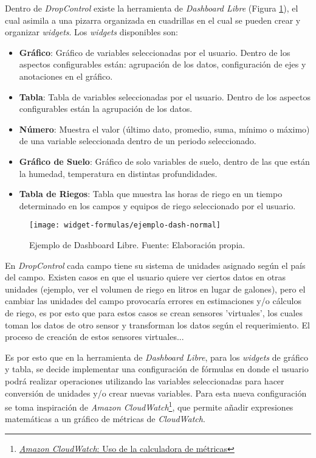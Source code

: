 
Dentro de \textit{DropControl} existe la herramienta de \textit{Dashboard Libre} (Figura \ref{fig:dash-example}), el cual asimila a una pizarra organizada en cuadrillas en el cual se pueden crear y organizar \textit{widgets}.
Los \textit{widgets} disponibles son:
\begin{itemize}
    \item \textbf{Gráfico}: Gráfico de variables seleccionadas por el usuario. Dentro de los aspectos configurables están: agrupación de los datos, configuración de ejes y anotaciones en el gráfico.
    \item \textbf{Tabla}: Tabla de variables seleccionadas por el usuario. Dentro de los aspectos configurables están la agrupación de los datos.
    \item \textbf{Número}: Muestra el valor (último dato, promedio, suma, mínimo o máximo) de una variable seleccionada dentro de un periodo seleccionado.
    \item \textbf{Gráfico de Suelo}: Gráfico de solo variables de suelo, dentro de las que están la humedad, temperatura en distintas profundidades.
    \item \textbf{Tabla de Riegos}: Tabla que muestra las horas de riego en un tiempo determinado en los campos y equipos de riego seleccionado por el usuario.
\end{itemize}

\begin{figure}[H]
	\centering
	\texttt{[image: widget-formulas/ejemplo-dash-normal]}
	\caption{\label{fig:dash-example} Ejemplo de Dashboard Libre. Fuente: Elaboración propia.}
\end{figure}

En \textit{DropControl} cada campo tiene su sistema de unidades asignado según el país del campo. Existen casos en que el usuario quiere ver ciertos datos en otras unidades (ejemplo, ver el volumen de riego en litros en lugar de galones), pero el cambiar las unidades del campo provocaría errores en estimaciones y/o cálculos de riego, es por esto que para estos casos se crean sensores 'virtuales', los cuales toman los datos de otro sensor y transforman los datos según el requerimiento.
El proceso de creación de estos sensores virtuales...

Es por esto que en la herramienta de \textit{Dashboard Libre}, para los \textit{widgets} de gráfico y tabla, se decide implementar una configuración de fórmulas en donde el usuario podrá realizar operaciones utilizando las variables seleccionadas para hacer conversión de unidades y/o crear nuevas variables.
Para esta nueva configuración se toma inspiración de \textit{Amazon CloudWatch}\footnote{\href{https://docs.aws.amazon.com/es_es/AmazonCloudWatch/latest/monitoring/using-metric-math.html}{\textit{Amazon CloudWatch}: Uso de la calculadora de métricas}}, que permite añadir expresiones matemáticas a un gráfico de métricas de \textit{CloudWatch}.

